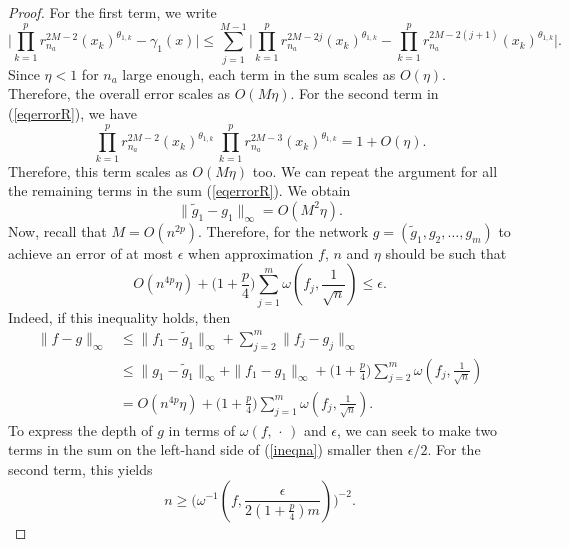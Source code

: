 \documentclass[anon,12pt]{colt2021} %
\begin{document}
\begin{proof}
For the first term, we write
\begin{equation*}
    \big \vert \prod_{k=1}^{p} r_{n_{a}}^{2M-2}(x_{k})^{\theta_{1,k}} - \gamma_{1}(x) \big \vert \leq  \sum_{j=1}^{M-1} \big \vert \prod_{k=1}^{p} r_{n_{a}}^{2M-2j}(x_{k})^{\theta_{1,k}} - \prod_{k=1}^{p} r_{n_{a}}^{2M-2(j+1)}(x_{k})^{\theta_{1,k}} \big \vert .
\end{equation*}
Since $\eta <1$ for $n_{a}$ large enough, each term in the sum scales as $O(\eta)$. Therefore, the overall error scales as $O(M \eta)$. For the second term in (\ref{eqerrorR}), we have
\begin{equation*}
    \prod_{k=1}^{p} r_{n_{a}}^{2M-2}(x_{k})^{\theta_{1,k}} \, \prod_{k=1}^{p} r_{n_{a}}^{2M-3}(x_{k})^{\theta_{1,k}} = 1 + O(\eta).
\end{equation*}
Therefore, this term scales as $O(M \eta)$ too. We can repeat the argument for all the remaining terms in the sum (\ref{eqerrorR}). We obtain
\begin{equation*}
    \| \tilde g_{1}- g_{1} \|_{\infty} = O(M^{2} \eta).
\end{equation*}
Now, recall that $M = O(n^{2p})$. Therefore, for the network $g = (\tilde g_{1}, g_{2}, \dots, g_{m})$ to achieve an error of at most $\epsilon$ when approximation $f$, $n$ and $\eta$ should be such that
\begin{equation} \label{ineqna}
    O(n^{4p} \eta) + \big ( 1+ \frac{p}{4}\big) \sum_{j=1}^{m} \omega(f_{j}, \frac{1}{\sqrt{n}}) \leq \epsilon.
\end{equation}
Indeed, if this inequality holds, then
\begin{align*}
    \|f - g \|_{\infty} &\leq \| f_{1} - \tilde g_{1} \|_{\infty} + \sum_{j=2}^{m} \| f_{j} - g_{j} \|_{\infty} \\
    &\leq \| g_{1} - \tilde g_{1} \|_{\infty} + \|f_{1} - g_{1} \|_{\infty} + \big ( 1+ \frac{p}{4}\big)\sum_{j=2}^{m} \omega(f_{j}, \frac{1}{\sqrt{n}}) \\
    &= O(n^{4p} \eta) + \big ( 1+ \frac{p}{4}\big) \sum_{j=1}^{m} \omega(f_{j}, \frac{1}{\sqrt{n}}).
\end{align*}
To express the depth of $g$ in terms of $\omega(f, \, \cdot \,)$ and $\epsilon$, we can seek to make two terms in the sum on the left-hand side of (\ref{ineqna}) smaller then $\epsilon /2$. For the second term, this yields
\begin{equation} \label{uboundn}
    n \geq \big( \omega^{-1}(f, \frac{\epsilon}{2(1+\frac{p}{4})m}) \big)^{-2}.
\end{equation}

\end{proof}
\end{document}

